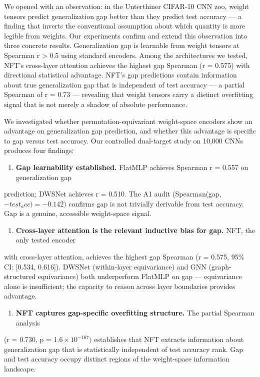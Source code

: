 
We opened with an observation: in the Unterthiner CIFAR-10 CNN zoo, weight tensors predict
generalization gap better than they predict test accuracy --- a finding that inverts the conventional
assumption about which quantity is more legible from weights. Our experiments confirm and extend
this observation into three concrete results. Generalization gap is learnable from weight tensors
at Spearman r > 0.5 using standard encoders. Among the architectures we tested, NFT's cross-layer
attention achieves the highest gap Spearman (r = 0.575) with directional statistical advantage.
NFT's gap predictions contain information about true generalization gap that is independent of test
accuracy --- a partial Spearman of r = 0.73 --- revealing that weight tensors carry a distinct
overfitting signal that is not merely a shadow of absolute performance.

We investigated whether permutation-equivariant weight-space encoders show an advantage on
generalization gap prediction, and whether this advantage is specific to gap versus test accuracy.
Our controlled dual-target study on 10,000 CNNs produces four findings:

\begin{enumerate}
\item \textbf{Gap learnability established.} FlatMLP achieves Spearman r = 0.557 on generalization gap
\end{enumerate}
   prediction; DWSNet achieves r = 0.510. The A1 audit (Spearman(gap, $-test_acc) = -0.142)$
   confirms gap is not trivially derivable from test accuracy. Gap is a genuine, accessible
   weight-space signal.

\begin{enumerate}
\item \textbf{Cross-layer attention is the relevant inductive bias for gap.} NFT, the only tested encoder
\end{enumerate}
   with cross-layer attention, achieves the highest gap Spearman (r = 0.575, 95\% CI: [0.534, 0.616]).
   DWSNet (within-layer equivariance) and GNN (graph-structured equivariance) both underperform
   FlatMLP on gap --- equivariance alone is insufficient; the capacity to reason across layer
   boundaries provides advantage.

\begin{enumerate}
\item \textbf{NFT captures gap-specific overfitting structure.} The partial Spearman analysis
\end{enumerate}
   (r = 0.730, p = 1.$6\times 10^{-167})$ establishes that NFT extracts information about generalization gap
   that is statistically independent of test accuracy rank. Gap and test accuracy occupy distinct
   regions of the weight-space information landscape.

